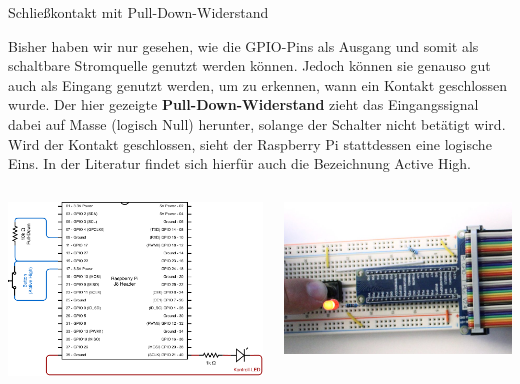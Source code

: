 {
\footnotesize

\begin{frame}{Schließkontakt mit Pull-Down-Widerstand}
    \parbox{\linewidth}{
        Bisher haben wir nur gesehen, wie die GPIO-Pins als Ausgang und somit als schaltbare Stromquelle
        genutzt werden können. Jedoch können sie genauso gut auch als Eingang genutzt werden, um zu erkennen,
        wann ein Kontakt geschlossen wurde. Der hier gezeigte \textbf{Pull-Down-Widerstand} zieht das
        Eingangssignal dabei auf Masse (logisch Null) herunter, solange der Schalter nicht betätigt wird.
        Wird der Kontakt geschlossen, sieht der Raspberry Pi stattdessen eine logische Eins. In der Literatur
        findet sich hierfür auch die Bezeichnung \glqq{}Active High\grqq{}.
    }

    \bigskip

    \begin{columns}
        \includegraphics[width=\textwidth]{2-hardwaredesign/img/button_pulldown_schaltplan}

        \includegraphics[width=\textwidth]{2-hardwaredesign/img/button_pulldown_foto}
    \end{columns}
\end{frame}
}

